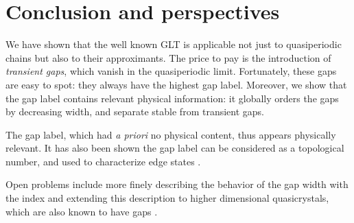 \documentclass[a4paper]{jpconf}
\begin{document}


\section*{Conclusion and perspectives}

We have shown that the well known GLT is applicable not just to quasiperiodic chains but also to their approximants.
The price to pay is the introduction of \emph{transient gaps}, which vanish in the quasiperiodic limit. 
Fortunately, these gaps are easy to spot: they always have the highest gap label.
Moreover, we show that the gap label contains relevant physical information: it globally orders the gaps by decreasing width, and separate stable from transient gaps.

The gap label, which had \emph{a priori} no physical content, thus appears physically relevant.
It has also been shown the gap label can be considered as a topological number, and used to characterize edge states \cite{Levy2015}.

Open problems include more finely describing the behavior of the gap width with the index and extending this description to higher dimensional quasicrystals, which are also known to have gaps \cite{Zijlstra, penrosegaps}.

\begin{fullwidth}
\bibhang=50pt
\printbibliography
\end{fullwidth}
\end{document}

